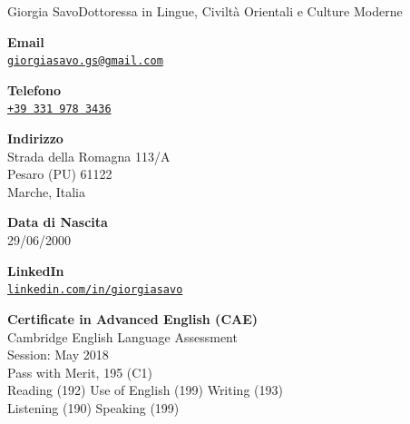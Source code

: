 \documentclass{article}
\begin{document}
\begin{cv}[avatar]{Giorgia Savo}{Dottoressa in Lingue, Civiltà Orientali e Culture Moderne}
\cvsidebar %


\begin{cvitem}[Envelope][4]
    \textbf{Email}\\
    \href{mailto:}{\texttt{giorgiasavo.gs@gmail.com}}
\end{cvitem}

\cvseparator[3]
\begin{cvitem}[Phone][5]
    \textbf{Telefono}\\
    \href{tel:+393319783436}{\texttt{+39 331 978 3436}}
\end{cvitem}

\cvseparator[3]
\begin{cvitem}[Home][5]
    \textbf{Indirizzo}\\
    Strada della Romagna 113/A\\ Pesaro (PU) 61122\\ Marche, Italia
\end{cvitem}

\cvseparator[3]
\begin{cvitem}[BirthdayCake][5]
    \textbf{Data di Nascita}\\
    29/06/2000
\end{cvitem}

\cvseparator[3]
\begin{cvitem}[Linkedin][5]
	\textbf{LinkedIn}\\
	\href{www.linkedin.com/in/giorgiasavo}{\texttt{linkedin.com/in/giorgiasavo}}
\end{cvitem}


\scriptsize \textbf{Certificate in Advanced English (CAE)}\\
Cambridge English Language Assessment\\
Session: May 2018\\
Pass with Merit, 195 (C1)\\
Reading (192) Use of English (199) Writing (193)\\Listening (190) Speaking (199)\\
\\
\normalsize
{}
\normalsize


\end{cv}
\end{document}
